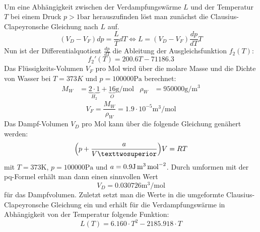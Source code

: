 \\
Um eine Abhängigkeit zwischen der Verdampfungswärme $L$ und der Temperatur
$T$ bei einem Druck $p > 1\si{\bar}$ herauszufinden löst man zunächst die
Clausius-Clapeyronsche Gleichung nach $L$ auf.
\begin{equation}
  (V_D - V_F) dp = \frac{L}{T} dT
  \iff L = (V_D - V_F) \frac{dp}{dT} T
\end{equation}
Nun ist der Differentialquotient $\frac{dp}{dT}$ die Ableitung der
Ausgleichsfunktion $f_2(T)$:
\begin{equation}
  f_2'(T) = 200.6 T - 71186.3
\end{equation}
Das Flüssigkeits-Volumen $V_F$ pro Mol wird über die molare Masse und die
Dichte von Wasser\cite{stoffwerte} bei $T = 373 K$ und
$p = 100000 \si{\Pa}$ berechnet:
\begin{align}
  M_W & = \underbrace{2 \cdot 1}_{H_2} + \underbrace{16}_{O}
  \si{\gram\per\mol} & \rho_W & = 950000 \si{\gram\per\cubic\meter}
\end{align}
\begin{equation}
  V_F = \frac{M_W}{\rho_W} = 1.9 \cdot 10^{-5} \si{\cubic\meter\per\mol}
\end{equation}
Das Dampf-Volumen $V_D$ pro Mol kann über die folgende Gleichung genähert
werden:
\begin{equation}
  \Bigl(p + \frac{a}{V²}\Bigr)V = R T
\end{equation} mit $T = 373 \si{\kelvin}$, $p = 100000 \si{\Pa}$ und
$a = 0.9 \si[per-mode=reciprocal]{\joule\cubic\meter\per\mol\squared}$.
Durch umformen mit der \\
pq-Formel erhält man dann einen sinnvollen Wert
\begin{equation}
  V_D = 0.030726 \si{\cubic\meter\per\mol}
\end{equation} für das Dampfvolumen.
Zuletzt setzt man die Werte in die umgeformte
Clausius-Clapeyronsche Gleichung ein und erhält für die Verdampfungswärme in
Abhängigkeit von der Temperatur folgende Funktion:
\begin{equation}
  L(T) = 6.160 \cdot T^2 - 2185.918 \cdot T
\end{equation}

\newpage

